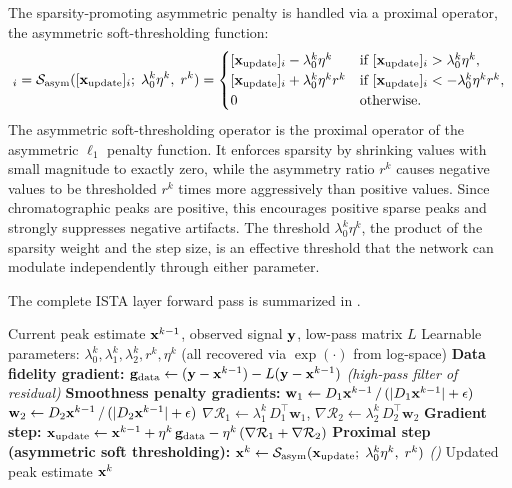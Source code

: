The sparsity-promoting asymmetric penalty is handled via a proximal operator, the asymmetric soft-thresholding function:
\begin{equation}
    [\xvec^k]_i = \mathcal{S}_{\text{asym}}([\xvec_{\text{update}}]_i;\; \lambda_0^k \eta^k,\; r^k) =
    \begin{cases}
        [\xvec_{\text{update}}]_i - \lambda_0^k \eta^k & \text{if } [\xvec_{\text{update}}]_i > \lambda_0^k \eta^k, \\
        [\xvec_{\text{update}}]_i + \lambda_0^k \eta^k r^k & \text{if } [\xvec_{\text{update}}]_i < -\lambda_0^k \eta^k r^k, \\
        0 & \text{otherwise}.
    \end{cases}
    \label{eq:asym_threshold}
\end{equation}
The asymmetric soft-thresholding operator is the proximal operator of the asymmetric $\ell_1$ penalty function. It enforces sparsity by shrinking values with small magnitude to exactly zero, while the asymmetry ratio $r^k$ causes negative values to be thresholded $r^k$ times more aggressively than positive values. Since chromatographic peaks are positive, this encourages positive sparse peaks and strongly suppresses negative artifacts. The threshold $\lambda_0^k \eta^k$, the product of the sparsity weight and the step size, is an effective threshold that the network can modulate independently through either parameter.

The complete ISTA layer forward pass is summarized in .

\begin{algorithm}[t]
    \caption{ISTA Layer Forward Pass}
    \label{alg:beadslayer}
    \begin{algorithmic}[1]
        \REQUIRE Current peak estimate $\mathbf{x}^{k-1}$, observed signal $\mathbf{y}$, low-pass matrix $L$
        \REQUIRE Learnable parameters: $\lambda_0^k, \lambda_1^k, \lambda_2^k, r^k, \eta^k$ (all recovered via $\exp(\cdot)$ from log-space)
        \STATE \textbf{Data fidelity gradient:}
        \STATE $\mathbf{g}_{\text{data}} \leftarrow (\mathbf{y} - \mathbf{x}^{k-1}) - L(\mathbf{y} - \mathbf{x}^{k-1})$ \hfill \textit{(high-pass filter of residual)}
        \STATE \textbf{Smoothness penalty gradients:}
        \STATE $\mathbf{w}_1 \leftarrow D_1 \mathbf{x}^{k-1} \,/\, (|D_1 \mathbf{x}^{k-1}| + \epsilon)$
        \STATE $\mathbf{w}_2 \leftarrow D_2 \mathbf{x}^{k-1} \,/\, (|D_2 \mathbf{x}^{k-1}| + \epsilon)$
        \STATE $\nabla \mathcal{R}_1 \leftarrow \lambda_1^k \, D_1^\top \mathbf{w}_1$, \quad $\nabla \mathcal{R}_2 \leftarrow \lambda_2^k \, D_2^\top \mathbf{w}_2$
        \STATE \textbf{Gradient step:}
        \STATE $\mathbf{x}_{\text{update}} \leftarrow \mathbf{x}^{k-1} + \eta^k \, \mathbf{g}_{\text{data}} - \eta^k \, (\nabla \mathcal{R}_1 + \nabla \mathcal{R}_2)$
        \STATE \textbf{Proximal step (asymmetric soft thresholding):}
        \STATE $\mathbf{x}^k \leftarrow \mathcal{S}_{\text{asym}}(\mathbf{x}_{\text{update}};\; \lambda_0^k \eta^k,\; r^k)$ \hfill \textit{()}
        \ENSURE Updated peak estimate $\mathbf{x}^k$
    \end{algorithmic}
\end{algorithm}


